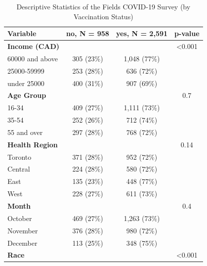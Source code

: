 \documentclass[
  letterpaper,
  DIV=11,
  numbers=noendperiod]{scrartcl}
\begin{document}
\hypertarget{tbl-descriptive-stats}{}
\begin{table}
\caption{\label{tbl-descriptive-stats}Descriptive Statistics of the Fields COVID-19 Survey (by Vaccination
Status) }\tabularnewline

\centering\begingroup\fontsize{9}{11}\selectfont

\begin{tabular}{lccc}
\toprule
\textbf{Variable} & \textbf{no}, N = 958 & \textbf{yes}, N = 2,591 & \textbf{p-value}\\
\midrule
\textbf{Income (CAD)} &  &  & <0.001\\
\hspace{1em}60000 and above & 305 (23\%) & 1,048 (77\%) & \\
\hspace{1em}25000-59999 & 253 (28\%) & 636 (72\%) & \\
\hspace{1em}under 25000 & 400 (31\%) & 907 (69\%) & \\
\textbf{Age Group} &  &  & 0.7\\
\hspace{1em}16-34 & 409 (27\%) & 1,111 (73\%) & \\
\hspace{1em}35-54 & 252 (26\%) & 712 (74\%) & \\
\hspace{1em}55 and over & 297 (28\%) & 768 (72\%) & \\
\textbf{Health Region} &  &  & 0.14\\
\hspace{1em}Toronto & 371 (28\%) & 952 (72\%) & \\
\hspace{1em}Central & 224 (28\%) & 580 (72\%) & \\
\hspace{1em}East & 135 (23\%) & 448 (77\%) & \\
\hspace{1em}West & 228 (27\%) & 611 (73\%) & \\
\textbf{Month} &  &  & 0.4\\
\hspace{1em}October & 469 (27\%) & 1,263 (73\%) & \\
\hspace{1em}November & 376 (28\%) & 980 (72\%) & \\
\hspace{1em}December & 113 (25\%) & 348 (75\%) & \\
\textbf{Race} &  &  & <0.001\\

\end{tabular}
\end{table}
\end{document}
